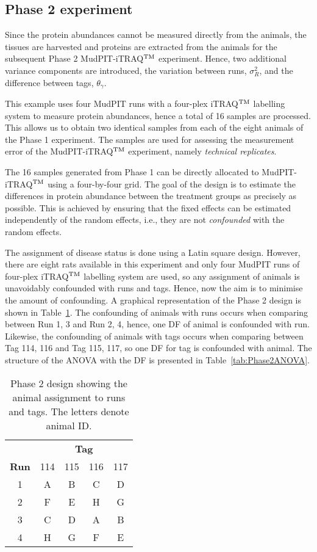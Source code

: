 \documentclass[article]{jss}
\begin{document}
\subsection{Phase 2 experiment}\label{subsec:Phase2Exp}
Since the protein abundances cannot be measured directly from the animals, the tissues are harvested and proteins are extracted from the animals for the subsequent Phase 2 MudPIT-iTRAQ$^{\rm TM}$ experiment. Hence, two additional variance components are introduced, the variation between runs, $\sigma_{R}^2$, and the difference between tags, $\theta_{\gamma}$.

This example uses four MudPIT runs with a four-plex iTRAQ$^{\rm TM}$ labelling system to measure protein abundances, hence a total of 16 samples are processed. This allows us to obtain two identical samples from each of the eight animals of the Phase 1 experiment. The samples are used for assessing the measurement error of the MudPIT-iTRAQ$^{\rm TM}$ experiment, namely \emph{technical replicates}.

The 16 samples generated from Phase 1 can be directly allocated to MudPIT-iTRAQ$^{\rm TM}$ using a four-by-four grid. The goal of the design is to estimate the differences in protein abundance between the treatment groups as precisely as possible. This is achieved by ensuring that the fixed effects can be estimated independently of the random effects, i.e., they are not \emph{confounded} with the random effects.

The assignment of disease status is done using a Latin square design. However, there are eight rats available in this experiment and only four MudPIT runs of four-plex iTRAQ$^{\rm TM}$ labelling system are used, so any assignment of animals is unavoidably confounded with runs and tags. Hence, now the aim is to minimise the amount of confounding. A graphical representation of the Phase 2 design is shown in Table~\ref{tab:phase2Design}. The confounding of animals with runs occurs when comparing between Run 1, 3 and Run 2, 4, hence, one DF of animal is confounded with run. Likewise, the confounding of animals with tags occurs when comparing between Tag 114, 116 and Tag 115, 117, so one DF for tag is confounded with animal. The structure of the ANOVA with the DF is presented in Table~\ref{tab:Phase2ANOVA}.

\begin{table}[ht]
\centering
\caption{Phase 2 design showing the animal assignment to runs and tags. The letters denote animal ID.}
\begin{tabular}[t]{c|cccc}
 & \multicolumn{4}{c}{{\bf Tag}} \\
{\bf Run}  & 114 & 115 & 116 & 117 \\ 
\hline 
1 & A & B & C & D \\ 
2 & F & E & H & G \\ 
3 & C & D & A & B \\ 
4 & H & G & F & E \\ 
\end{tabular} 
\label{tab:phase2Design}
\end{table}
\end{document}
